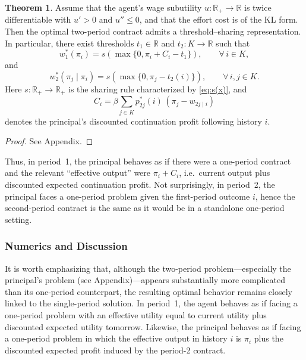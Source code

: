 \documentclass[12pt]{article}
\theoremstyle{definition}
\newtheorem{theorem}{Theorem}[section]
\begin{document}
\begin{theorem}\label{thm:two_period_structure}
Assume that the agent’s wage subutility \(u:\mathbb{R}_+\to\mathbb{R}\) is twice differentiable with \(u'>0\) and \(u''\le 0\), and that the effort cost is of the KL form. 
Then the optimal two-period contract admits a threshold--sharing representation. In particular, there exist thresholds \(t_1\in\mathbb{R}\) and \(t_2:K\to\mathbb{R}\) such that
\begin{equation}\label{eq:w1_general}
w_1^*(\pi_i)=s\!\left(\max\{0,\pi_i+C_i-t_1\}\right),
\qquad \forall\, i\in K,
\end{equation}
and
\begin{equation}\label{eq:w2_general}
w_2^*(\pi_j\mid \pi_i)=s\!\left(\max\{0,\pi_j-t_2(i)\}\right),
\qquad \forall\, i,j\in K.
\end{equation}
Here \(s:\mathbb{R}_+\to\mathbb{R}_+\) is the sharing rule characterized by \eqref{eq:s(x)}, and
\[
C_i=\beta\sum_{j\in K}p_{2j}^*(i)\,(\pi_j-w_{2j\mid i})
\]
denotes the principal’s discounted continuation profit following history \(i\).
\end{theorem}
\begin{proof}
See Appendix.
\end{proof}
Thus, in period~1, the principal behaves as if there were a one-period contract and the relevant ``effective output'' were \(\pi_i+C_i\), i.e.\ current output plus discounted expected continuation profit.
Not surprisingly, in period~2, the principal faces a one-period problem given the first-period outcome \(i\), hence the second-period contract is the same as it would be in a standalone one-period setting.

\subsubsection{Numerics and Discussion}
It is worth emphasizing that, although the two-period problem---especially the principal’s problem (see Appendix)---appears substantially more complicated than its 
one-period counterpart, the resulting optimal behavior remains closely linked to the single-period solution. In period~1, the agent behaves as if facing a one-period 
problem with an effective utility equal to current utility plus discounted expected utility tomorrow. Likewise, the principal behaves as if facing a one-period 
problem in which the effective output in history \(i\) is \(\pi_i\) plus the discounted expected profit induced by the period-2 contract.
\end{document}
